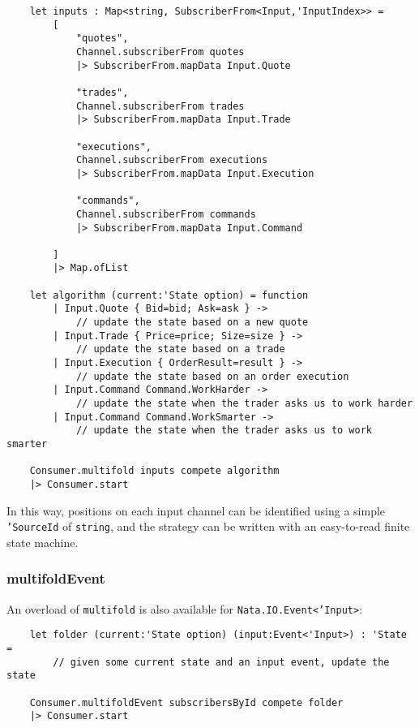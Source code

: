 \documentclass{article}
\begin{document}
\begin{verbatim}
    let inputs : Map<string, SubscriberFrom<Input,'InputIndex>> =
        [
            "quotes",
            Channel.subscriberFrom quotes
            |> SubscriberFrom.mapData Input.Quote

            "trades",
            Channel.subscriberFrom trades
            |> SubscriberFrom.mapData Input.Trade

            "executions",
            Channel.subscriberFrom executions
            |> SubscriberFrom.mapData Input.Execution

            "commands",
            Channel.subscriberFrom commands
            |> SubscriberFrom.mapData Input.Command

        ]
        |> Map.ofList

    let algorithm (current:'State option) = function
        | Input.Quote { Bid=bid; Ask=ask } ->
            // update the state based on a new quote
        | Input.Trade { Price=price; Size=size } ->
            // update the state based on a trade
        | Input.Execution { OrderResult=result } ->
            // update the state based on an order execution
        | Input.Command Command.WorkHarder ->
            // update the state when the trader asks us to work harder
        | Input.Command Command.WorkSmarter ->
            // update the state when the trader asks us to work smarter

    Consumer.multifold inputs compete algorithm
    |> Consumer.start
\end{verbatim}

In this way, positions on each input channel can be identified using a simple \texttt{'SourceId} of \texttt{string}, and the strategy can be written with an easy-to-read finite state machine.

\subsubsection{multifoldEvent}

An overload of \texttt{multifold} is also available for \texttt{Nata.IO.Event<'Input>}:

\begin{verbatim}
    let folder (current:'State option) (input:Event<'Input>) : 'State =
        // given some current state and an input event, update the state

    Consumer.multifoldEvent subscribersById compete folder
    |> Consumer.start
\end{verbatim}
\end{document}
